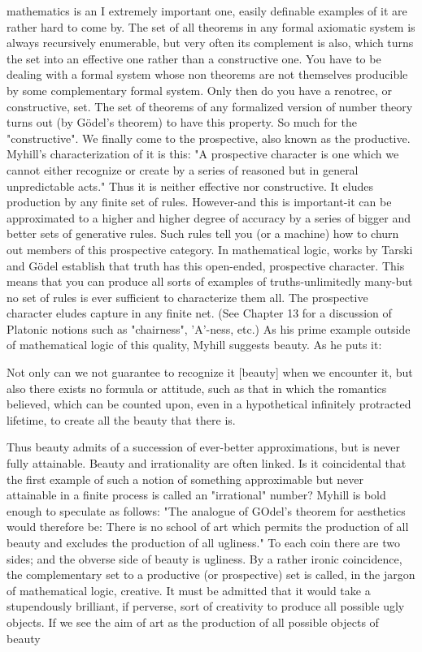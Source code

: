 mathematics is an I extremely important one, easily definable examples of it are rather
hard to come by. The set of all theorems in any formal axiomatic system is always
recursively enumerable, but very often its complement is also, which turns the set into
an effective one rather than a constructive one. You have to be dealing with a formal
system whose non theorems are not themselves producible by some complementary
formal system. Only then do you have a renotrec, or constructive, set. The set of
theorems of any formalized version of number theory turns out (by Gödel’s theorem)
to have this property.
        So much for the "constructive". We finally come to the prospective, also
known as the productive. Myhill's characterization of it is this: "A prospective
character is one which we cannot either recognize or create by a series of reasoned but
in general unpredictable acts." Thus it is neither effective nor constructive. It eludes
production by any finite set of rules. However-and this is important-it can be
approximated to a higher and higher degree of accuracy by a series of bigger and
better sets of generative rules. Such rules tell you (or a machine) how to churn out
members of this prospective category. In mathematical logic, works by Tarski and
Gödel establish that truth has this open-ended, prospective character. This means that
you can produce all sorts of examples of truths-unlimitedly many-but no set of rules is
ever sufficient to characterize them all. The prospective character eludes capture in
any finite net. (See Chapter 13 for a discussion of Platonic notions such as
"chairness", 'A'-ness, etc.)
As his prime example outside of mathematical logic of this quality, Myhill suggests
beauty. As he puts it:

  Not only can we not guarantee to recognize it [beauty] when we encounter it,
  but also there exists no formula or attitude, such as that in which the romantics
  believed, which can be counted upon, even in a hypothetical infinitely
  protracted lifetime, to create all the beauty that there is.

Thus beauty admits of a succession of ever-better approximations, but is never fully
attainable. Beauty and irrationality are often linked. Is it coincidental that the first
example of such a notion of something approximable but never attainable in a finite
process is called an "irrational" number?
        Myhill is bold enough to speculate as follows: "The analogue of GOdel's
theorem for aesthetics would therefore be: There is no school of art which permits the
production of all beauty and excludes the production of all ugliness." To each coin
there are two sides; and the obverse side of beauty is ugliness. By a rather ironic
coincidence, the complementary set to a productive (or prospective) set is called, in
the jargon of mathematical logic, creative. It must be admitted that it would take a
stupendously brilliant, if perverse, sort of creativity to produce all possible ugly
objects.
        If we see the aim of art as the production of all possible objects of beauty




